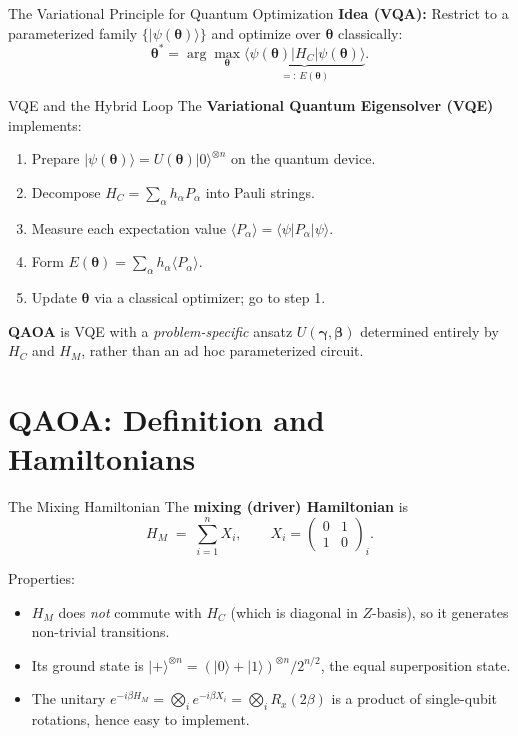 \documentclass{beamer}
\begin{document}
\begin{frame}
\begin{frame}{The Variational Principle for Quantum Optimization}
\textbf{Idea (VQA):} Restrict to a parameterized family
$\{|\psi(\boldsymbol{\theta})\rangle\}$
and optimize over $\boldsymbol{\theta}$ classically:
\[
\boldsymbol{\theta}^* = \arg\max_{\boldsymbol{\theta}}
\underbrace{\langle\psi(\boldsymbol{\theta})|H_C|\psi(\boldsymbol{\theta})\rangle}_{=:\,E(\boldsymbol{\theta})}.
\]
\end{frame}


\begin{frame}{VQE and the Hybrid Loop}
The \textbf{Variational Quantum Eigensolver (VQE)} implements:

\begin{enumerate}
\item Prepare $|\psi(\boldsymbol{\theta})\rangle = U(\boldsymbol{\theta})|0\rangle^{\otimes n}$
  on the quantum device.
\item Decompose $H_C = \sum_\alpha h_\alpha P_\alpha$ into Pauli strings.
\item Measure each expectation value
  $\langle P_\alpha\rangle = \langle\psi|P_\alpha|\psi\rangle$.
\item Form $E(\boldsymbol{\theta}) = \sum_\alpha h_\alpha \langle P_\alpha\rangle$.
\item Update $\boldsymbol{\theta}$ via a classical optimizer; go to step 1.
\end{enumerate}

\medskip

\textbf{QAOA} is VQE with a \emph{problem-specific} ansatz
$U(\boldsymbol{\gamma},\boldsymbol{\beta})$ determined entirely by
$H_C$ and $H_M$, rather than an ad hoc parameterized circuit.
\end{frame}


\section{QAOA: Definition and Hamiltonians}

\begin{frame}{The Mixing Hamiltonian}
The \textbf{mixing (driver) Hamiltonian} is
\[
H_M \;=\; \sum_{i=1}^n X_i, \qquad
X_i = \begin{pmatrix}0&1\\1&0\end{pmatrix}_i.
\]

Properties:
\begin{itemize}
\item $H_M$ does \emph{not} commute with $H_C$ (which is diagonal in
  $Z$-basis), so it generates non-trivial transitions.
\item Its ground state is $|+\rangle^{\otimes n} =
  (|0\rangle+|1\rangle)^{\otimes n}/2^{n/2}$, the equal
  superposition state.
\item The unitary $e^{-i\beta H_M} = \bigotimes_i e^{-i\beta X_i} =
  \bigotimes_i R_x(2\beta)$ is a product of single-qubit rotations,
  hence easy to implement.
\end{itemize}


\end{frame}
\end{frame}
\end{document}
